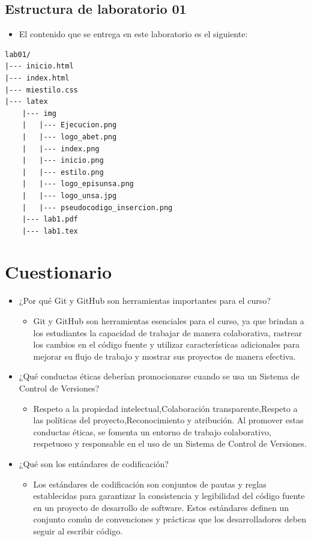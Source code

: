 \documentclass{article}
\begin{document}
	\subsection{Estructura de laboratorio 01}
	\begin{itemize}	
		\item El contenido que se entrega en este laboratorio es el siguiente:
	\end{itemize}
	
\begin{lstlisting}[style=ascii-tree]
lab01/
|--- inicio.html
|--- index.html
|--- miestilo.css
|--- latex
    |--- img
    |   |--- Ejecucion.png
    |   |--- logo_abet.png
    |   |--- index.png
    |   |--- inicio.png
    |   |--- estilo.png
    |   |--- logo_episunsa.png
    |   |--- logo_unsa.jpg
    |   |--- pseudocodigo_insercion.png    
    |--- lab1.pdf    
    |--- lab1.tex
\end{lstlisting}    

\section{Cuestionario}
	\begin{itemize}
		\item ¿Por qué Git y GitHub son herramientas importantes para el curso?
        \begin{itemize}
           \item Git y GitHub son herramientas esenciales para el curso, ya que brindan a los estudiantes la capacidad de trabajar de manera colaborativa, rastrear los cambios en el código fuente y utilizar características adicionales para mejorar su flujo de trabajo y mostrar sus proyectos de manera efectiva.
        \end{itemize}
        \item ¿Qué conductas éticas deberían promocionarse cuando se usa un Sistema de Control de Versiones?
        \begin{itemize}
           \item Respeto a la propiedad intelectual,Colaboración transparente,Respeto a las políticas del proyecto,Reconocimiento y atribución. Al promover estas conductas éticas, se fomenta un entorno de trabajo colaborativo, respetuoso y responsable en el uso de un Sistema de Control de Versiones.
        \end{itemize}
        \item ¿Qué son los entándares de codificación?
        \begin{itemize}
           \item Los estándares de codificación son conjuntos de pautas y reglas establecidas para garantizar la consistencia y legibilidad del código fuente en un proyecto de desarrollo de software. Estos estándares definen un conjunto común de convenciones y prácticas que los desarrolladores deben seguir al escribir código.
        \end{itemize}
	\end{itemize}		
\end{document}
